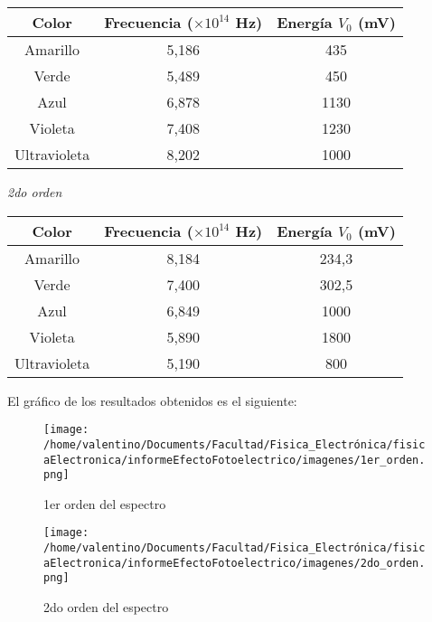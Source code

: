 \documentclass[a4paper]{article}
\begin{document}
      \begin{tabular}{ c c c }
        \toprule
        Color & Frecuencia ($\times 10^{14}$ Hz) & Energía $V_{0}$ (mV)\\
          \midrule
          Amarillo      & 5,186 & 435   \\
          Verde         & 5,489 & 450   \\
          Azul          & 6,878 & 1130  \\
          Violeta       & 7,408 & 1230  \\
          Ultravioleta  & 8,202 & 1000  \\
        \bottomrule
      \end{tabular}

      \begin{minipage}[c]{7.5cm}
        \vspace{5mm}
        \centering
        \textit{2do orden} 
        \vspace{2mm}
      \end{minipage}

      \begin{tabular}{ c c c }
        \toprule
        Color & Frecuencia ($\times 10^{14}$ Hz) & Energía $V_{0}$ (mV) \\
          \midrule
          Amarillo      & 8,184 & 234,3 \\
          Verde         & 7,400 & 302,5 \\
          Azul          & 6,849 & 1000  \\
          Violeta       & 5,890 & 1800  \\
          Ultravioleta  & 5,190 & 800   \\
        \bottomrule
      \end{tabular}
      \vspace{25mm}

      \indent El gráfico de los resultados obtenidos es el siguiente:

      \begin{figure}[h]
        \centering
        \texttt{[image: /home/valentino/Documents/Facultad/Fisica\_Electrónica/fisicaElectronica/informeEfectoFotoelectrico/imagenes/1er\_orden.png]}
        \caption{\small 1er orden del espectro}
      \end{figure} 

      \begin{figure}[ht]
        \centering
        \texttt{[image: /home/valentino/Documents/Facultad/Fisica\_Electrónica/fisicaElectronica/informeEfectoFotoelectrico/imagenes/2do\_orden.png]}
        \caption{\small 2do orden del espectro}
      \end{figure}
      \vspace{5mm}
\end{document}
